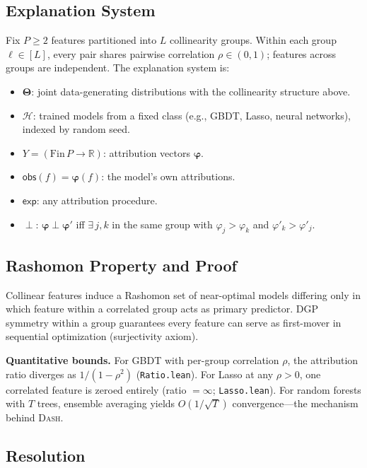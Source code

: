 \documentclass{article}
\newcommand{\R}{\mathbb{R}}
\newcommand{\DASH}{\textsc{Dash}}
\newcommand{\GBDT}{\textsc{GBDT}}
\newcommand{\Params}{\mathbf{\Theta}}
\newcommand{\sH}{\mathcal{H}}
\newcommand{\incomp}{\perp}
\begin{document}
\subsection{Explanation System}

Fix $P \geq 2$ features partitioned into $L$ collinearity groups.  Within each group
$\ell \in [L]$, every pair shares pairwise correlation $\rho \in (0,1)$;
features across groups are independent.  The explanation system is:
\begin{itemize}
  \item $\Params$: joint data-generating distributions with the collinearity structure above.
  \item $\sH$: trained models from a fixed class (e.g., \GBDT{}, Lasso, neural networks), indexed by random seed.
  \item $Y = (\mathrm{Fin}\,P \to \R)$: attribution vectors $\boldsymbol{\varphi}$.
  \item $\mathsf{obs}(f) = \boldsymbol{\varphi}(f)$: the model's own attributions.
  \item $\mathsf{exp}$: any attribution procedure.
  \item $\incomp$: $\boldsymbol{\varphi} \incomp \boldsymbol{\varphi}'$ iff $\exists\, j,k$ in the same group with $\varphi_j > \varphi_k$ and $\varphi'_k > \varphi'_j$.
\end{itemize}

\subsection{Rashomon Property and Proof}

Collinear features induce a Rashomon set of near-optimal models differing only in which feature within a correlated group acts as primary predictor.  DGP symmetry within a group guarantees every feature can serve as first-mover in sequential optimization (surjectivity axiom).

\textbf{Quantitative bounds.}  For \GBDT{} with per-group correlation $\rho$, the attribution ratio diverges as $1/(1-\rho^2)$ (\texttt{Ratio.lean}).  For Lasso at any $\rho > 0$, one correlated feature is zeroed entirely (ratio $= \infty$; \texttt{Lasso.lean}).  For random forests with $T$ trees, ensemble averaging yields $O(1/\sqrt{T})$ convergence---the mechanism behind \DASH{}.

\subsection{Resolution}
\end{document}
